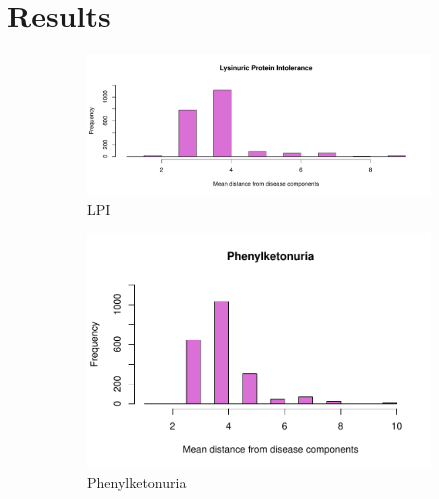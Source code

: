 \chapter{Results}\label{chap:results_rankings}

\begin{figure}[h!]
    \centering
    \begin{subfigure}[b]{0.3\textwidth}
         \centering
          \includegraphics[scale=0.25]{Images/Lisinuric Protein Intolerance.pdf}
         \caption{LPI}
         \label{fig:Lisinuric}
     \end{subfigure}
     \hfill
     \begin{subfigure}[b]{0.3\textwidth}
         \centering
         \includegraphics[scale=0.25]{Images/Phenylketonuria.pdf}
         \caption{Phenylketonuria}
         \label{fig:Phenylketonuria}
     \end{subfigure}
     \hfill
     \begin{subfigure}[b]{0.3\textwidth}
         \centering

\end{subfigure}
\end{figure}
